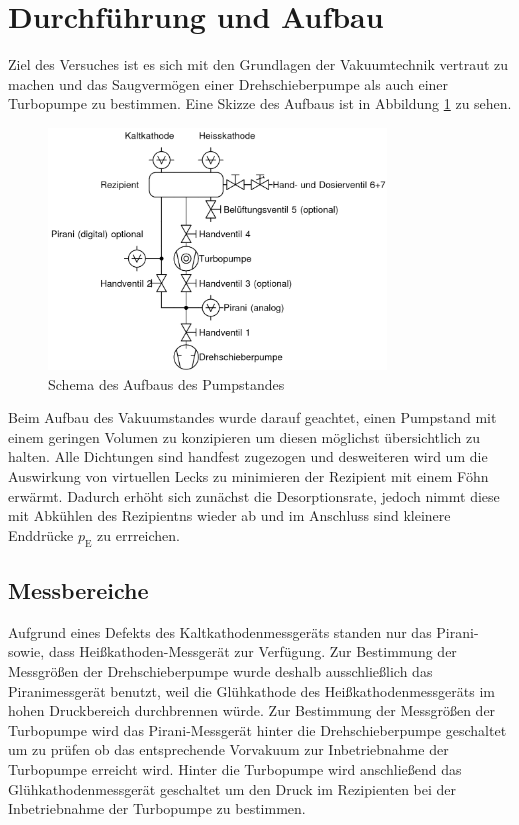 \section{Durchführung und Aufbau}
\label{sec:Durchführung}
Ziel des Versuches ist es sich mit den Grundlagen der Vakuumtechnik vertraut zu machen und das Saugvermögen einer Drehschieberpumpe als auch einer Turbopumpe zu bestimmen. Eine Skizze des Aufbaus ist in Abbildung \ref{fig:pump} zu sehen.
\begin{figure}[htpb]
  \centering
\includegraphics[width=0.8\textwidth]{picture/pumpaufbau.png}
\caption{Schema des Aufbaus des Pumpstandes \cite{Pfeiffer}}
  \label{fig:pump}
\end{figure}
Beim Aufbau des Vakuumstandes wurde darauf geachtet, einen Pumpstand mit einem geringen Volumen zu konzipieren um diesen möglichst übersichtlich zu halten. Alle Dichtungen sind handfest zugezogen und desweiteren wird um die Auswirkung von virtuellen Lecks zu minimieren der Rezipient mit einem Föhn erwärmt. Dadurch erhöht sich zunächst die Desorptionsrate, jedoch nimmt diese mit Abkühlen des Rezipientns wieder ab und im Anschluss sind kleinere Enddrücke $p_\text{E}$ zu errreichen.
\subsection{Messbereiche}
Aufgrund eines Defekts des Kaltkathodenmessgeräts standen nur das Pirani- sowie, dass Heißkathoden-Messgerät zur Verfügung. Zur Bestimmung der Messgrößen der Drehschieberpumpe wurde deshalb ausschließlich das Piranimessgerät benutzt, weil die Glühkathode des Heißkathodenmessgeräts im hohen Druckbereich durchbrennen würde. \newline
Zur Bestimmung der Messgrößen der Turbopumpe wird das Pirani-Messgerät hinter die Drehschieberpumpe geschaltet um zu prüfen ob das entsprechende Vorvakuum zur Inbetriebnahme der Turbopumpe erreicht wird. Hinter die Turbopumpe wird anschließend das Glühkathodenmessgerät geschaltet um den Druck im Rezipienten bei der Inbetriebnahme der Turbopumpe zu bestimmen.
